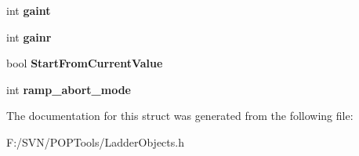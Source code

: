 \begin{DoxyCompactItemize}
\item 
\hypertarget{struct_ladder_elem_multiset_d_a_prop_a70923bbc0f669a83e4a033fe0bd82b58}{int {\bfseries gaint}}\label{struct_ladder_elem_multiset_d_a_prop_a70923bbc0f669a83e4a033fe0bd82b58}

\item 
\hypertarget{struct_ladder_elem_multiset_d_a_prop_a0bafd8eb80ca041b78c992c6be4853ed}{int {\bfseries gainr}}\label{struct_ladder_elem_multiset_d_a_prop_a0bafd8eb80ca041b78c992c6be4853ed}

\item 
\hypertarget{struct_ladder_elem_multiset_d_a_prop_a367e9de9b387d8ee7488473981a0dca2}{bool {\bfseries Start\-From\-Current\-Value}}\label{struct_ladder_elem_multiset_d_a_prop_a367e9de9b387d8ee7488473981a0dca2}

\item 
\hypertarget{struct_ladder_elem_multiset_d_a_prop_a5bc493f52de34b08542a5f98a1c08e6d}{int {\bfseries ramp\-\_\-abort\-\_\-mode}}\label{struct_ladder_elem_multiset_d_a_prop_a5bc493f52de34b08542a5f98a1c08e6d}

\end{DoxyCompactItemize}


The documentation for this struct was generated from the following file\-:\begin{DoxyCompactItemize}
\item 
F\-:/\-S\-V\-N/\-P\-O\-P\-Tools/Ladder\-Objects.\-h\end{DoxyCompactItemize}
